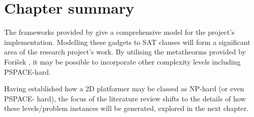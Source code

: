 \documentclass[11pt, a4paper, oneside]{report} %
\begin{document}


\section{Chapter summary}

The frameworks provided by \cite{Aloupis2012} give a comprehensive model for the
project's implementation. Modelling these gadgets to SAT clauses will form a
significant area of the research project's work. By utilising the metatheorms
provided by Fori\v{s}ek \cite{DBLP:conf/fun/Forisek10}, it may be possible to
incorporate other complexity levels including PSPACE-hard.

Having established how a 2D platformer may be classed as NP-hard (or even
PSPACE- hard), the focus of the literature review shifts to the details of how
these levels/problem instances will be generated, explored in the next chapter.





\end{document}
